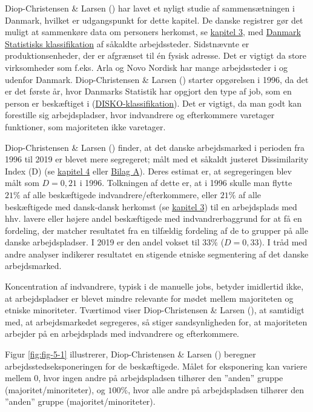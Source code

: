 \documentclass[
]{book}
\begin{document}
Diop-Christensen \& Larsen () har lavet et nyligt studie af sammensætningen i Danmark, hvilket er udgangspunkt for dette kapitel. De danske registrer gør det muligt at sammenkøre data om personers herkomst, se \hyperref[kap3]{kapitel 3}, med \href{https://www.dst.dk/Site/Dst/SingleFiles/GetArchiveFile.aspx?fi=659482655935&fo=0&ext=kvaldel}{Danmark Statistisks klassifikation} af såkaldte arbejdssteder. Sidstnævnte er produktionsenheder, der er afgrænset til én fysisk adresse. Det er vigtigt da store virksomheder som f.eks. Arla og Novo Nordisk har mange arbejdssteder i og udenfor Danmark. Diop-Christensen \& Larsen () starter opgørelsen i 1996, da det er det første år, hvor Danmarks Statistik har opgjort den type af job, som en person er beskæftiget i (\href{https://www.dst.dk/Site/Dst/SingleFiles/GetArchiveFile.aspx?fi=2299282738&fo=0&ext=kvaldel}{DISKO-klassifikation}). Det er vigtigt, da man godt kan forestille sig arbejdspladser, hvor indvandrere og efterkommere varetager funktioner, som majoriteten ikke varetager.

Diop-Christensen \& Larsen () finder, at det danske arbejdsmarked i perioden fra 1996 til 2019 er blevet mere segregeret; målt med et såkaldt justeret Dissimilarity Index (D) (se \hyperref[kap4]{kapitel 4} eller \hyperref[bilagA]{Bilag A}). Deres estimat er, at segregeringen blev målt som \(D=0,21\) i 1996. Tolkningen af dette er, at i 1996 skulle man flytte \(21\%\) af alle beskæftigede indvandrere/efterkommere, eller \(21\%\) af alle beskæftigede med dansk-dansk herkomst (se \hyperref[kap3]{kapitel 3}) til en arbejdsplads med hhv. lavere eller højere andel beskæftigede med indvandrerbaggrund for at få en fordeling, der matcher resultatet fra en tilfældig fordeling af de to grupper på alle danske arbejdspladser. I 2019 er den andel vokset til \(33\%\) (\(D=0,33\)). I tråd med andre analyser indikerer resultatet en stigende etniske segmentering af det danske arbejdsmarked.

Koncentration af indvandrere, typisk i de manuelle jobs, betyder imidlertid ikke, at arbejdspladser er blevet mindre relevante for mødet mellem majoriteten og etniske minoriteter. Tværtimod viser Diop-Christensen \& Larsen (), at samtidigt med, at arbejdsmarkedet segregeres, så stiger sandsynligheden for, at majoriteten arbejder på en arbejdsplads med indvandrere og efterkommere.

Figur \ref{fig:fig-5-1} illustrerer, Diop-Christensen \& Larsen () beregner arbejdsstedseksponeringen for de beskæftigede. Målet for eksponering kan variere mellem \(0\), hvor ingen andre på arbejdspladsen tilhører den ''anden'' gruppe (majoritet/minoriteter), og \(100\%\), hvor alle andre på arbejdspladsen tilhører den ''anden'' gruppe (majoritet/minoriteter).
\end{document}

